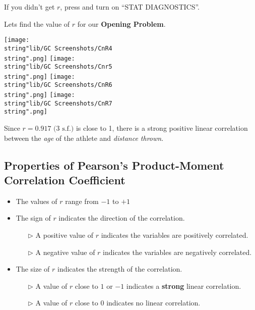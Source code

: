 \documentclass[11pt,a4paper]{book}
\begin{document}
If you didn't get $r$, press \tcbox[box align=base,nobeforeafter,colback=black, colframe=black,size=small]{\textbf{\textcolor{white}{mode}}}
and turn on ``STAT DIAGNOSTICS\textquotedblright .

Lets find the value of $r$ for our \textbf{Opening Problem}.
\begin{center}

\texttt{[image: \\string"lib/GC Screenshots/CnR4\\string".png]}
\texttt{[image: \\string"lib/GC Screenshots/Cnr5\\string".png]}
\texttt{[image: \\string"lib/GC Screenshots/CnR6\\string".png]}
\texttt{[image: \\string"lib/GC Screenshots/CnR7\\string".png]}
\par\end{center}

Since $r=0.917\text{ (3 s.f.)}$ is close to 1, there is a strong
positive linear correlation between the \textit{age} of the athlete
and \textit{distance thrown}.

\newpage

\subsection{Properties of Pearson's Product-Moment Correlation Coefficient}

\begin{itemize}

\item The values of $r$ range from $-1$ to $+1$

\item The sign of $r$ indicates the direction of the correlation.

\begin{itemize}

\item[$\triangleright$]  A positive value of $r$ indicates the variables
are positively correlated.

\item[$\triangleright$]  A negative value of $r$ indicates the variables
are negatively correlated.

\end{itemize}

\item  The size of $r$ indicates the strength of the correlation.

\begin{itemize}

\item[$\triangleright$]  A value of $r$ close to $1$ or $-1$ indicates
a \textbf{strong} linear correlation.

\item[$\triangleright$]  A value of $r$ close to $0$ indicates
no linear correlation.

\end{itemize}

\end{itemize}
\end{document}
